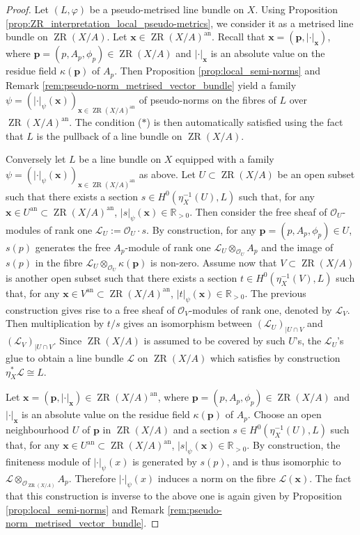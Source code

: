 \documentclass [11pt,reqno]{amsart}
\def\bR{{\mathbb{R}}}
\newcommand{\1}{\mathmybb{1}}
\def\cL{{\mathcal{L}}}
\def\cO{{\mathcal{O}}}
\def\an{\operatorname{an}}
\def\ZR{\operatorname{ZR}}
\begin{document}
\begin{proof}
Let $(L,\varphi)$ be a pseudo-metrised line bundle on $X$. Using Proposition \ref{prop:ZR_interpretation_local_pseudo-metrics}, we consider it as a metrised line bundle on $\ZR(X/A)$. Let $\mathbf{x}\in \ZR(X/A)^{\an}$. Recall that $\mathbf{x}=(\mathbf{p},|\cdot|_{\mathbf{x}})$, where $\mathbf{p}=(p,A_{p},\phi_{p})\in \ZR(X/A)$ and $|\cdot|_{\mathbf{x}}$ is an absolute value on the residue field $\kappa(\mathbf{p})$ of $A_{p}$. Then Proposition \ref{prop:local_semi-norms} and Remark \ref{rem:pseudo-norm_metrised_vector_bundle} yield a family $\psi=(|\cdot|_{\psi}(\mathbf{x}))_{\mathbf{x}\in \ZR(X/A)^{\an}}$ of pseudo-norms on the fibres of $L$ over $\ZR(X/A)^{\an}$. The condition ($\ast$) is then automatically satisfied using the fact that $L$ is the pullback of a line bundle on $\ZR(X/A)$. 

Conversely let $L$ be a line bundle on $X$ equipped with a family $\psi=(|\cdot|_{\psi}(\mathbf{x}))_{\mathbf{x}\in \ZR(X/A)^{\an}}$ as above. Let $U\subset \ZR(X/A)$ be an open subset such that there exists a section $s\in H^{0}(\eta_{X}^{-1}(U),L)$ such that, for any $\mathbf{x}\in U^{\an} \subset \ZR(X/A)^{\an}$, $|s|_{\psi}(\mathbf{x})\in \bR_{>0}$. Then consider the free sheaf of $\cO_{U}$-modules of rank one $\cL_{U} := \cO_{U}\cdot s$. By construction, for any $\mathbf{p}=(p,A_{p},\phi_{p})\in U$, $s(p)$ generates the free $A_{p}$-module of rank one $\cL_{U}\otimes_{\cO_{U}}A_{p}$ and the image of $s(p)$ in the fibre $\cL_{U}\otimes_{\cO_{U}}\kappa(\mathbf{p})$ is non-zero. Assume now that $V\subset \ZR(X/A)$ is another open subset such that there exists a section $t\in H^{0}(\eta_{X}^{-1}(V),L)$ such that, for any $\mathbf{x}\in V^{\an} \subset \ZR(X/A)^{\an}$, $|t|_{\psi}(\mathbf{x})\in \bR_{>0}$. The previous construction gives rise to a free sheaf of $\cO_{V}$-modules of rank one, denoted by $\cL_{V}$. Then multiplication by $t/s$ gives an isomorphism between $(\cL_{U})_{|U\cap V}$ and $(\cL_{V})_{|U\cap V}$. Since $\ZR(X/A)$ is assumed to be covered by such $U$'s, the $\cL_{U}$'s glue to obtain a line bundle $\cL$ on $\ZR(X/A)$ which satisfies by construction $\eta_{X}^{\ast}\cL\cong L$. 

Let $\mathbf{x}=(\mathbf{p},|\cdot|_{\mathbf{x}})\in \ZR(X/A)^{\an}$, where $\mathbf{p}=(p,A_{p},\phi_{p})\in \ZR(X/A)$ and $|\cdot|_{\mathbf{x}}$ is an absolute value on the residue field $\kappa(\mathbf{p})$ of $A_{p}$. Choose an open neighbourhood $U$ of $\mathbf{p}$ in $\ZR(X/A)$ and a section $s\in H^{0}(\eta_{X}^{-1}(U),L)$ such that, for any $\mathbf{x}\in U^{\an} \subset \ZR(X/A)^{\an}$, $|s|_{\psi}(\mathbf{x})\in \bR_{>0}$. By construction, the finiteness module of $|\cdot|_{\psi}(x)$ is generated by $s(p)$, and is thus isomorphic to $\cL\otimes_{\cO_{\ZR(X/A)}}A_{p}$. Therefore $|\cdot|_{\psi}(x)$ induces a norm on the fibre $\cL(\mathbf{x})$. The fact that this construction is inverse to the above one is again given by Proposition \ref{prop:local_semi-norms} and Remark \ref{rem:pseudo-norm_metrised_vector_bundle}.
\end{proof}
\end{document}
